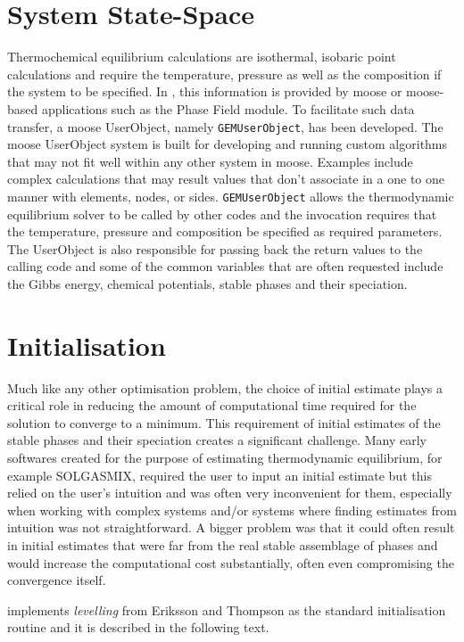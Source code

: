 \section{System State-Space}
	Thermochemical equilibrium calculations are isothermal, isobaric point calculations and require the temperature, pressure as well as the composition if the system to be specified. In {\GEM}, this information is provided by \gls{moose} or \gls{moose}-based applications such as the Phase Field module. To facilitate such data transfer, a \gls{moose} UserObject, namely \texttt{GEMUserObject}, has been developed. The \gls{moose} UserObject system is built for developing and running custom algorithms that may not fit well within any other system in \gls{moose}. Examples include complex calculations that may result values that don't associate in a one to one manner with elements, nodes, or sides. \texttt{GEMUserObject} allows the thermodynamic equilibrium solver to be called by other codes and the invocation requires that the temperature, pressure and composition be specified as required parameters. The UserObject is also responsible for passing back the return values to the calling code and some of the common variables that are often requested include the Gibbs energy, chemical potentials, stable phases and their speciation.

\section{Initialisation}
	Much like any other optimisation problem, the choice of initial estimate plays a critical role in reducing the amount of computational time required for the solution to converge to a minimum. This requirement of initial estimates of the stable  phases and their speciation creates a significant challenge. Many early softwares created for the purpose of estimating thermodynamic equilibrium, for example SOLGASMIX, required the user to input an initial estimate but this relied on the user's intuition and was often very inconvenient for them, especially when working with complex systems and/or systems where finding estimates from intuition was not straightforward. A bigger problem was that it could often result in initial estimates that were far from the real stable assemblage of phases and would increase the computational cost substantially, often even compromising the convergence itself. 

    {\GEM} implements \emph{levelling} from Eriksson and Thompson \cite{Eriksson89} as the standard initialisation routine and it is described in the following text.
	
